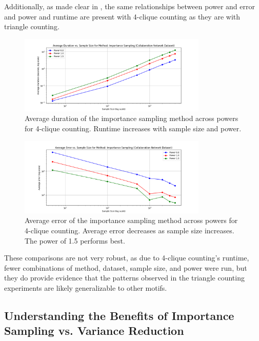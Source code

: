 \documentclass[11pt, margin=1in]{article}
\begin{document}
Additionally, as made clear in , the same relationships between power and error and power and runtime are present with 4-clique counting as they are with triangle counting.

\begin{figure}[H]
    \centering
    \includegraphics[width=0.8\textwidth]{plots/4-clique/importance-sampling/avg_duration_Importance Sampling.png}
    \caption{Average duration of the importance sampling method across powers for 4-clique counting. Runtime increases with sample size and power.}
    \label{fig:4_clique_avg_duration_importance_sampling}
\end{figure}

\begin{figure}[H]
    \centering
    \includegraphics[width=0.8\textwidth]{plots/4-clique/importance-sampling/avg_error_Importance Sampling.png}
    \caption{Average error of the importance sampling method across powers for 4-clique counting. Average error decreases as sample size increases. The power of 1.5 performs best.}
    \label{fig:4_clique_avg_error_importance_sampling}
\end{figure}

These comparisons are not very robust, as due to 4-clique counting's runtime, fewer combinations of method, dataset, sample size, and power were run, but they do provide evidence that the patterns observed in the triangle counting experiments are likely generalizable to other motifs.

\subsection{Understanding the Benefits of Importance Sampling vs. Variance Reduction}
\end{document}

